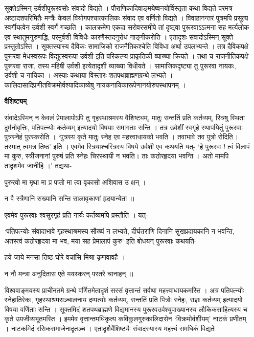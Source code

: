 \documentclass[11pt, a5paper]{article}
\begin{document}
सूक्तेऽस्मिन् उर्वशीपुरूरवसोः संवादो विद्यते । पौराणिकादिवाङ्मयेष्वनयोर्विस्तृता कथा विद्यते परमत्र अष्टादशपरिमितैः मन्त्रैः केवलं वियोगपश्चात्कालिकः संवाद एव वर्णितो विद्यते । विवाहानन्तरं पुत्रमपि प्रसूत्य स्वर्गीयत्वेन उर्वशी स्वर्गं गच्छति । कालक्रमेण एकदा सरोवरसमीपे तां दृष्ट्वा पुरूरवाऽऽत्मना सह मर्त्यलोक एव स्थातुमनुरुणद्धि, परमुर्वशी विविधैः कारणैस्तदनुरोधं नाङ्गीकरोति । एतादृशः संवादोऽस्मिन् सूक्ते प्रस्तुतोऽस्ति । सूक्तस्यास्य दैविकः सामाजिको राजनैतिकश्चेति विविधा अर्था उपलभ्यन्ते । तत्र दैविकपक्षे पुरूरवा मेधस्वरूपः विद्युत्स्वरूपा उर्वशी इति परिकल्प्य प्राकृतिकी व्याख्या क्रियते । तथा च राजनीतिकपक्षे पुरूरवा राजा, तस्य महिषी उर्वशी इत्येतादृशी व्याख्या विधीयते । सामाजिकदृष्ट्या तु पुरूरवा नायकः, उर्वशी च नायिका । अस्याः कथाया विस्तारः शतपथब्राह्मणग्रन्थे लभ्यते । कालिदासादिप्रणीतविक्रमोर्वश्यादिकाव्येषु नायकनायिकारूपेणानयोरुपस्थापनम् ।

\textbf{वैशिष्ट्यम्}

संवादेऽस्मिन् न केवलं प्रेमालापोऽपि तु गृहस्थाश्रमस्य वैशिष्ट्यम्, मातुः सन्ततिं प्रति कर्तव्यम्, स्त्रिषु स्थिता  दुर्मनोवृत्तिः, पतिपत्न्योः कर्तव्यम् इत्यादयो विषयाः समागताः सन्ति । तत्र उर्वशीं स्वगृहे स्थापयितुं पुरूरवाः पुत्रस्नेहं पुरस्करोति । ‘पुत्रस्य कृते मातुः स्नेह एव महत्त्वाधायको भवति । तवाभावे तव पुत्रो रोदिति। तस्मात् त्वमत्र तिष्ठ’ इति । एवमेव स्त्रियाश्चरित्रस्य विषये उर्वशी एव कथयति यत्- ‘हे पुरूरवः ! त्वं विलापं मा कुरु, स्त्रीजनानां पुरुषं प्रति स्नेहः चिरस्थायी न भवति। ताः कठोरहृदया भवन्ति । अतो मामपि तादृशमेव जानीहि ।’  तद्यथा-

पुरुरवो मा मृथा मा प्र पप्तो मा त्वा वृकासो अशिवास उ क्षन् ।

न वै स्त्रैणानि सख्यानि सन्ति सालावृकाणां हृदयान्येता ॥

एवमेव पुरूरवाः श्वसुरगृहं प्रति नार्यः कर्तव्यमपि प्रस्तौति । यत्-

‘पतिपत्न्योः संवादाभावे गृहस्थाश्रमस्य सौख्यं न लभ्यते, दीर्घतराणि दिनानि सुखप्रदायकानि न भवन्ति, अतस्त्वं कठोरहृदया मा भव, मया सह प्रेमालापं कुरु’ इति बोधयन् पुरूरवाः कथयति-

हये जाये मनसा तिष्ठ घोरे वचांसि मिश्रा कृणवावहै ।

न नौ मन्त्रा अनुदितास एते मयस्करन् परतरे चानाहन् ॥

विश्ववाङ्मयस्य प्राचीनतमे ग्रन्थे वर्णितमेतादृशं सरसं वृत्तान्तं सर्वथा महत्त्वाधायकमस्ति । अत्र पतिपत्न्योः स्नेहातिरेकः, गृहस्थाश्रमसञ्चालनाय दम्पत्योः कर्तव्यम्, सन्ततिं प्रति पित्रोः स्नेहः, राज्ञः कर्तव्यम् इत्यादयो विषया वर्णिताः सन्ति । सूक्तमिदं शतपथब्राह्मणे विद्यमानस्य पुरूरवउर्वश्युपाख्यानस्य लौकिकसाहित्यस्य च कृते उपजीव्यभूतमस्ति । इममेव वृत्तान्तमधिकृत्य कविकुलगुरुकालिदासेन ‘विक्रमोर्वशीयम्’ नाटकं प्रणीतम् । नाटकमिदं रसिकसमाजेनादृतञ्च । एतादृशैर्वैशिष्ट्यैः संवादस्यास्य महत्त्वं समधिकं विद्यते ।
\end{document}

